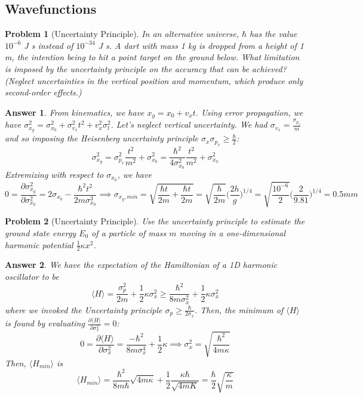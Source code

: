 \documentclass[a4paper]{article}
\newtheorem{ans}{Answer}[section]
\theoremstyle{new}
\newtheorem{qns}{Problem}[section]
\begin{document}
\subsection*{Wavefunctions}
\begin{qns}[Uncertainty Principle]
In an alternative universe, $\hbar$ has the value $10^{-6}$ J s instead of $10^{-34}$ J s. A dart with mass 1 kg is dropped from a height of 1 m, the intention being to hit a point target on the ground below. What limitation is imposed by the uncertainty principle on the accuracy that can be achieved?\\[5pt]
(Neglect uncertainties in the vertical position and momentum, which produce only second-order effects.)
\end{qns}
\begin{ans}
From kinematics, we have $x_g=x_0+v_xt$. Using error propagation, we have $\sigma_{x_g}^2=\sigma_{x_0}^2+\sigma_{v_x}^2t^2+v_x^2\sigma_t^2$. Let's neglect vertical uncertainty. We had $\sigma_{v_x}=\frac{\sigma_{p_x}}{m}$ and so imposing the Heisenberg uncertainty principle $\sigma_x\sigma_{p_x}\geq\frac{\hbar}{2}$: 
$$\sigma_{x_g}^2=\sigma_{p_x}^2\frac{t^2}{m^2}+\sigma_{x_0}^2=\frac{\hbar^2}{4\sigma_{x_0}^2}\frac{t^2}{m^2}+\sigma_{x_0}^2$$
Extremizing with respect to $\sigma_{x_0}$, we have
$$0=\frac{\partial\sigma_{x_g}^2}{\partial\sigma_{x_0}^2}=2\sigma_{x_0}-\frac{\hbar^2t^2}{2m\sigma_{x_0}^3}\implies\sigma_{x_g,min}=\sqrt{\frac{\hbar t}{2m}+\frac{\hbar t}{2m}}=\sqrt{\frac{\hbar}{2m}}\bigg(\frac{2h}{g}\bigg)^{1/4}=\sqrt{\frac{10^{-6}}{2}}\bigg(\frac{2}{9.81}\bigg)^{1/4}=0.5mm$$
\end{ans}
\begin{qns}[Uncertainty Principle]
Use the uncertainty principle to estimate the ground state energy $E_0$ of a particle of mass $m$ moving in a one-dimensional harmonic potential $\frac{1}{2}\kappa x^2$.
\end{qns}
\begin{ans}
We have the expectation of the Hamiltonian of a 1D harmonic oscillator to be
$$\langle H\rangle=\frac{\sigma_ p^2}{2m}+\frac{1}{2}\kappa\sigma_ x^2\geq\frac{\hbar^2}{8m\sigma_x^2}+\frac{1}{2}\kappa\sigma_x^2$$
where we invoked the Uncertainty principle $\sigma_ p\geq\frac{\hbar}{2\sigma_x}$. Then, the minimum of $\langle H\rangle$ is found by evaluating $\frac{\partial\langle H\rangle}{\partial\sigma_ x^2}=0$:
$$0=\frac{\partial\langle H\rangle}{\partial\sigma_x^2}=\frac{-\hbar^2}{8m\sigma_x^4}+\frac{1}{2}\kappa\implies\sigma_x^2=\sqrt{\frac{\hbar^2}{4m\kappa}}$$
Then, $\langle H_{min}\rangle$ is
$$\langle H_{min}\rangle=\frac{\hbar^2}{8m\hbar}\sqrt{4m\kappa}+\frac{1}{2}\frac{\kappa\hbar}{\sqrt{4mK}}=\frac{\hbar}{2}\sqrt{\frac{\kappa}{m}}$$
\end{ans}
\end{document}

